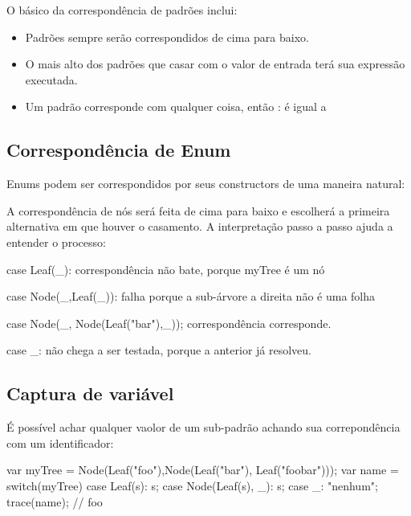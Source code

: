 {


O básico da correspondência de padrões inclui:

\begin{itemize}
    \item Padrões sempre serão correspondidos de cima para baixo.
    \item O mais alto dos padrões que casar com o valor de entrada terá sua expressão executada.
    \item Um padrão \expr{_} corresponde com qualquer coisa, então : é igual a 
\end{itemize}

\subsection{Correspondência de Enum}
\label{lf-pattern-matching-enums}

Enums podem ser correspondidos por seus constructors de uma maneira natural:



A correspondência de nós será feita de cima para baixo e escolherá a primeira alternativa em que houver o casamento. A interpretação passo a passo ajuda a entender o processo:

case Leaf(_): correspondência não bate, porque myTree é um nó

case Node(_,Leaf(_)): falha porque a sub-árvore a direita não é uma folha

case Node(_, Node(Leaf("bar"),_)); correspondência corresponde.

case _: não chega a ser testada, porque a anterior já resolveu.


\subsection{Captura de  variável} 

É possível achar qualquer vaolor de um sub-padrão achando sua correpondência com um identificador:

var myTree = Node(Leaf("foo"),Node(Leaf("bar"), Leaf("foobar")));
var name = switch(myTree) {
    case Leaf(s): s;
    case Node(Leaf(s), _): s;
    case _: "nenhum";
}
trace(name); // foo

}
